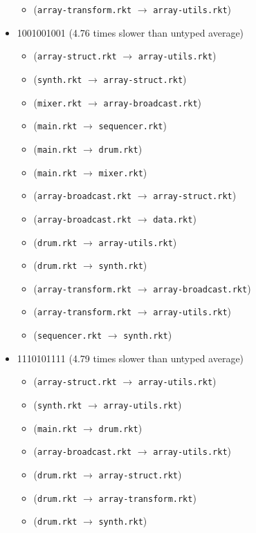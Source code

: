 \documentclass{article}
\newcommand{\mono}[1]{\texttt{#1}}
\begin{document}
\begin{itemize}
\begin{itemize}
  \item (\mono{array-transform.rkt} $\rightarrow$ \mono{array-utils.rkt})
  \end{itemize}
\item 1001001001 (4.76 times slower than untyped average)
  \begin{itemize}
  \item (\mono{array-struct.rkt} $\rightarrow$ \mono{array-utils.rkt})
  \item (\mono{synth.rkt} $\rightarrow$ \mono{array-struct.rkt})
  \item (\mono{mixer.rkt} $\rightarrow$ \mono{array-broadcast.rkt})
  \item (\mono{main.rkt} $\rightarrow$ \mono{sequencer.rkt})
  \item (\mono{main.rkt} $\rightarrow$ \mono{drum.rkt})
  \item (\mono{main.rkt} $\rightarrow$ \mono{mixer.rkt})
  \item (\mono{array-broadcast.rkt} $\rightarrow$ \mono{array-struct.rkt})
  \item (\mono{array-broadcast.rkt} $\rightarrow$ \mono{data.rkt})
  \item (\mono{drum.rkt} $\rightarrow$ \mono{array-utils.rkt})
  \item (\mono{drum.rkt} $\rightarrow$ \mono{synth.rkt})
  \item (\mono{array-transform.rkt} $\rightarrow$ \mono{array-broadcast.rkt})
  \item (\mono{array-transform.rkt} $\rightarrow$ \mono{array-utils.rkt})
  \item (\mono{sequencer.rkt} $\rightarrow$ \mono{synth.rkt})
  \end{itemize}
\item 1110101111 (4.79 times slower than untyped average)
  \begin{itemize}
  \item (\mono{array-struct.rkt} $\rightarrow$ \mono{array-utils.rkt})
  \item (\mono{synth.rkt} $\rightarrow$ \mono{array-utils.rkt})
  \item (\mono{main.rkt} $\rightarrow$ \mono{drum.rkt})
  \item (\mono{array-broadcast.rkt} $\rightarrow$ \mono{array-utils.rkt})
  \item (\mono{drum.rkt} $\rightarrow$ \mono{array-struct.rkt})
  \item (\mono{drum.rkt} $\rightarrow$ \mono{array-transform.rkt})
  \item (\mono{drum.rkt} $\rightarrow$ \mono{synth.rkt})

\end{itemize}
\end{itemize}
\end{document}
